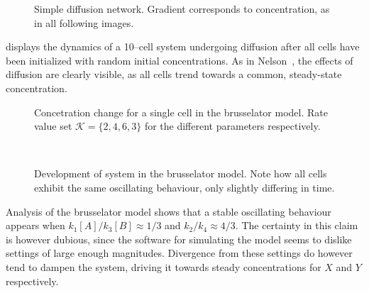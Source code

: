 \documentclass[a4paper,12pt]{article}
\theoremstyle{plain}
\theoremstyle{definition}
\begin{document}
      \begin{figure}[H]
         \centering
         \resizebox{.7\columnwidth}{!}{}
         \caption{Simple diffusion network. Gradient corresponds to
         concentration, as in all following images.}
         \label{fig:diff}
      \end{figure}
   
       displays the dynamics of a 10--cell system undergoing
      diffusion after all cells have been initialized with random initial
      concentrations. As in Nelson~\cite{nelson}, the effects of diffusion are
      clearly visible, as all cells trend towards a common, steady-state
      concentration.

      \begin{figure}[H]
         \vspace*{1cm}
         \hspace*{-2cm}
         \centering
         \begin{minipage}[t]{.6\textwidth}		
            \vspace{30pt}
            \centering
            \resizebox{\columnwidth}{!}{}
            \caption{Concetration change for a single cell in the brusselator
            model. Rate value set $\mathcal{K} = \{2, 4, 6, 3\}$ for the
            different parameters respectively.}
            \label{fig:br1}
         \end{minipage}~\hspace*{1em}
         \begin{minipage}[t]{.6\textwidth}		
            \vspace{0pt}
            \centering
            \resizebox{1.2\columnwidth}{!}{}
            \caption{Development of system in the brusselator model. Note how
            all cells exhibit the same oscillating behaviour, only slightly
            differing in time.}
            \label{fig:br2}
         \end{minipage}
      \end{figure}

      Analysis of the brusselator model shows that a stable oscillating behaviour
      appears when $k_1[A]/k_3[B] \approx 1/3$ and $k_2/k_4 \approx 4/3$. The
      certainty in this claim is however dubious, since the software for
      simulating the model seems to dislike settings of large enough magnitudes.
      Divergence from these settings do however tend to dampen the system,
      driving it towards steady concentrations for $X$ and $Y$ respectively.
\end{document}
